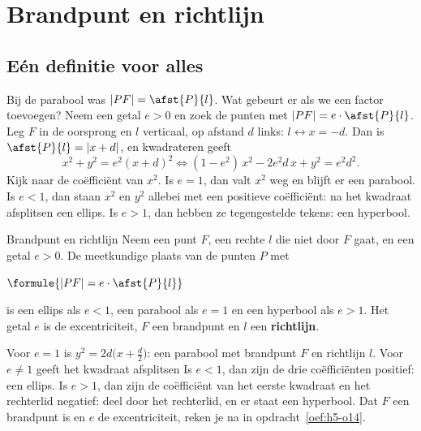 \begin{oefeningen}[Start]

\end{oefeningen}

\section{Brandpunt en richtlijn}

\subsection{Eén definitie voor alles}

Bij de parabool was $|PF| = \afst{P}{l}$. Wat gebeurt er als we een factor toevoegen? Neem een getal $e > 0$ en zoek de punten met $|PF| = e \cdot \afst{P}{l}$. Leg $F$ in de oorsprong en $l$ verticaal, op afstand $d$ links: $l \leftrightarrow x = -d$. Dan is $\afst{P}{l} = |x + d|$, en kwadrateren geeft
\[ x^2 + y^2 = e^2(x + d)^2 \iff (1 - e^2)\,x^2 - 2e^2d\,x + y^2 = e^2d^2 . \]
Kijk naar de coëfficiënt van $x^2$. Is $e = 1$, dan valt $x^2$ weg en blijft er een parabool. Is $e < 1$, dan staan $x^2$ en $y^2$ allebei met een positieve coëfficiënt: na het kwadraat afsplitsen een ellips. Is $e > 1$, dan hebben ze tegengestelde tekens: een hyperbool.

\begin{theorie}
\begin{stelling}{Brandpunt en richtlijn}
Neem een punt $F$, een rechte $l$ die niet door $F$ gaat, en een getal $e > 0$. De meetkundige plaats van de punten $P$ met

\vspace{1mm}
\qquad $\formule{|PF| = e \cdot \afst{P}{l}}$

\vspace{1mm}
is een ellips als $e < 1$, een parabool als $e = 1$ en een hyperbool als $e > 1$. Het getal $e$ is de excentriciteit, $F$ een brandpunt en $l$ een \textbf{\textcolor{accent}{richtlijn}}.
\end{stelling}

\begin{bewijs}
Voor $e = 1$ is $y^2 = 2d\bigl(x + \tfrac d2\bigr)$: een parabool met brandpunt $F$ en richtlijn $l$. Voor $e \neq 1$ geeft het kwadraat afsplitsen
Is $e < 1$, dan zijn de drie coëfficiënten positief: een ellips. Is $e > 1$, dan zijn de coëfficiënt van het eerste kwadraat en het rechterlid negatief: deel door het rechterlid, en er staat een hyperbool. Dat $F$ een brandpunt is en $e$ de excentriciteit, reken je na in opdracht~\ref{oef:h5-o14}.
\end{bewijs}
\end{theorie}


